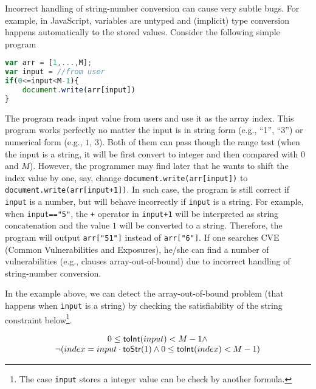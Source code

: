 \documentclass[sigplan,review,anonymous]{acmart}\settopmatter{printfolios=true,printccs=false,printacmref=false}
\begin{document}
Incorrect handling of string-number conversion can cause very subtle bugs.
For example, in JavaScript, variables are untyped and (implicit) type conversion happens automatically to the stored values. Consider the following simple program


\begin{lstlisting}[breaklines=true,language=JavaScript]
var arr = [1,...,M];
var input = //from user
if(0<=input<M-1){
	document.write(arr[input])
}
\end{lstlisting}

The program reads input value from users and use it as the array index. This program works perfectly no matter the input is in string form (e.g., ``1'', ``3'') or numerical form (e.g., $1$, $3$). Both of them can pass though the range test (when the input is a string, it will be first convert to integer and then compared with $0$ and $M$). However, the programmer may find later that he wants to shift the index value by one, say, change \texttt{document.write(arr[input])} to \texttt{document.write(arr[input+1])}. In such case, the program is still correct if \texttt{input} is a number, but will behave incorrectly if \texttt{input} is a string. For example, when \texttt{input=="5"}, the \texttt{+} operator in \texttt{input+1} will be interpreted as string concatenation and the value $1$ will be converted to a string. Therefore, the program will output \texttt{arr["51"]} instead of \texttt{arr["6"]}. If one searches CVE (Common Vulnerabilities and Exposures), he/she can find a number of vulnerabilities (e.g., clauses array-out-of-bound) due to incorrect handling of string-number conversion.

In the example above, we can detect the array-out-of-bound problem (that happens when \texttt{input} is a string) by checking the satisfiability of the string constraint below\footnote{The case \texttt{input} stores a integer value can be check by another formula.}. 

$$
\begin{array}{c}
0 \leq \mbox{\textsf{toInt}($input$)}<M-1 \wedge \\
\neg(index = input\cdot \mbox{\textsf{toStr}($1$)} \wedge 0 \leq \mbox{\textsf{toInt}($index$)} <M-1)
\end{array}
$$
\end{document}
